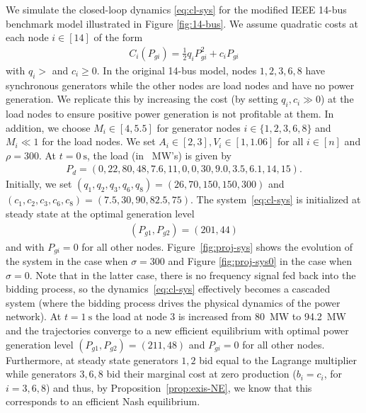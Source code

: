 \documentclass[journal]{IEEEtran}
\newcommand{\1}{\mathds 1}
\theoremstyle{remark}
\theoremstyle{definition}
\begin{document}
We simulate the closed-loop dynamics \eqref{eq:cl-sys} for the
modified IEEE 14-bus benchmark model illustrated in Figure
\ref{fig:14-bus}. We assume quadratic costs at each node $i\in[14]$ of
the form
\begin{align*}
  C_i(P_{gi})=\frac12q_iP_{gi}^2+c_iP_{gi}
\end{align*}
with $q_i>$ and $c_i\geq0$. In the original 14-bus model, nodes
$1,2,3,6,8$ have synchronous generators while the other nodes are
load nodes and have no power generation. We replicate this by
increasing the cost (by setting $q_i,c_i\gg0$) at the load nodes to
ensure positive power generation is not profitable at them.  In
addition, we choose $M_i\in[4,5.5]$ for generator nodes
$i\in\{1,2,3,6,8\}$ and $M_i\ll1$ for the load nodes. We set $
A_i\in[2,3], V_i\in[1,1.06]$ for all $i\in[n]$ and $\rho=300$. At
$t=\SI{0}{\second}$, the load (in \SI{}{\mega\watt}'s) is given by
\begin{align*}
  P_d= (0, 22, 80, 48, 7.6, 11, 0, 0, 30, 9.0, 3.5, 6.1, 14, 15).
\end{align*}
Initially, we set $(q_1,q_2,q_3,q_6,q_8)=(26,70,150,150,300)$ and
$(c_1,c_2,c_3,c_6,c_8)=(7.5,30,90,82.5,75)$. The
system~\eqref{eq:cl-sys} is initialized at steady state at the optimal
generation level
\begin{align*}
  (P_{g1},P_{g2})=(201, 44)
\end{align*}
and with $P_{gi}=0$ for all other nodes.  Figure~\ref{fig:proj-sys}
shows the evolution of the system in the case when $\sigma=300$ and
Figure \ref{fig:proj-sys0} in the case when $\sigma=0$. Note that in
the latter case, there is no frequency signal fed back into the
bidding process, so the dynamics~\eqref{eq:cl-sys} effectively becomes
a cascaded system (where the bidding process drives the physical
dynamics of the power network).  At $t=\SI{1}{\second}$ the load at
node $3$ is increased from \SI{80}{\mega\watt} to
\SI{94.2}{\mega\watt} and the trajectories converge to a new efficient
equilibrium with optimal power generation level
$(P_{g1},P_{g2})=(211,48)$ and $P_{gi}=0$ for all other
nodes. Furthermore, at steady state generators $1,2$ bid equal to the
Lagrange multiplier while generators $3,6,8$ bid their marginal cost
at zero production ($b_{i}=c_i$, for $i=3,6,8$) and thus, by
Proposition~\ref{prop:exis-NE}, we know that this corresponds to an
efficient Nash equilibrium.
\end{document}

